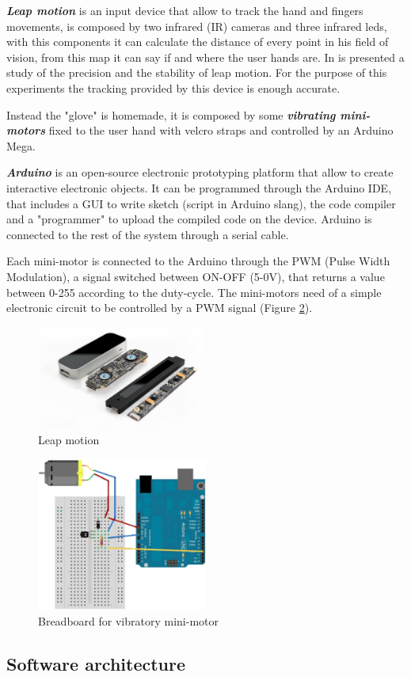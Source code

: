 \textbf{\textit{Leap motion}} is an input device that allow to track the hand and fingers movements, is composed by two infrared (IR) cameras and three infrared leds, with this components it can calculate the distance of every point in his field of vision, from this map it can say if and where the user hands are. 
In \cite{weichert2013analysis} is presented a study of the precision and the stability of leap motion. For the purpose of this experiments the tracking provided by this device is enough accurate.

Instead the "glove" is homemade, it is composed by some \textbf{\textit{vibrating mini-motors}} fixed to the user hand with velcro straps and controlled by an Arduino Mega.

\textbf{\textit{Arduino}} is an open-source electronic prototyping platform that allow to create interactive electronic objects. It can be programmed through the Arduino IDE, that includes a GUI to write sketch (script in Arduino slang), the code compiler and a "programmer" to upload the compiled code on the device. Arduino is connected to the rest of the system through a serial cable.

Each mini-motor is connected to the Arduino through the PWM (Pulse Width Modulation), a signal switched between ON-OFF (5-0V), that returns a value between 0-255 according to the duty-cycle.
The mini-motors need of a simple electronic circuit to be controlled by a PWM signal (Figure \ref{fig:breadboard}).



\begin{figure}
  \centering
    \includegraphics[width=0.5\textwidth]{img/leap_motion.eps}
  \caption{Leap motion}
  \label{fig:leap_motion}
\end{figure}

\begin{figure}
  \centering
    \includegraphics[width=0.5\textwidth]{img/breadboard.eps}
  \caption{Breadboard for vibratory mini-motor}
  \label{fig:breadboard}
\end{figure}

\subsection{Software architecture}